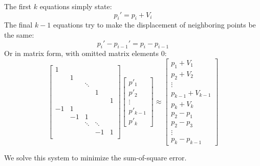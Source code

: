The first $k$ equations simply state:
\begin{equation}
p_i' = p_i + V_i
\end{equation}
The final $k-1$ equations try to make the displacement of neighboring points be the same:
\begin{equation}
p_i' - p_{i-1}' = p_i - p_{i-1}
\end{equation}
Or in matrix form, with omitted matrix elements 0:
\[
\left[
\begin{array}{ccccc}
1 &  &  &  & \\
 & 1 &  &  &  \\
 &  & \ddots &   &  \\
 &  &  & 1 &  \\
  &  &  &  & 1 \\
-1 & 1 &   &  &  \\
 & -1 & 1 &  &  \\
 &  & \ddots & \ddots &  \\
 &  &  & -1 & 1 \\
\end{array}
\right]
\left[
\begin{array}{c}
p'_1 \\
p'_2 \\
\vdots \\
p'_{k-1} \\
p'_k
\end{array}
\right]
 \approx
\left[
\begin{array}{c}
p_1 + V_1\\
p_2 + V_2\\
\vdots \\
p_{k-1} + V_{k-1}\\
p_k + V_k\\
p_2-p_1 \\
p_2-p_3 \\
\vdots \\
p_k - p_{k-1}
\end{array}
\right]
\]


We solve this system to minimize the sum-of-square error.
